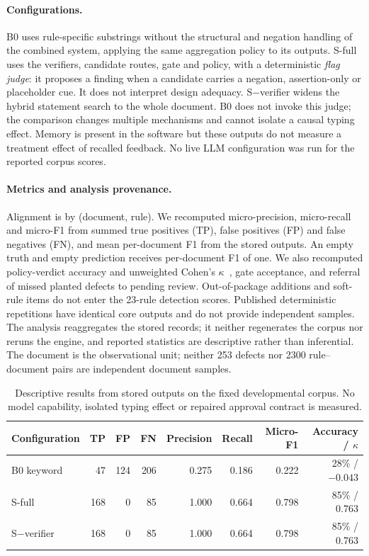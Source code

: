 \documentclass[computers,article,submit,moreauthors]{Definitions/mdpi}
\begin{document}
\paragraph{Configurations.}
B0 uses rule-specific substrings without the structural and negation handling of the combined system, applying the same aggregation policy to its outputs. S-full uses the verifiers, candidate routes, gate and policy, with a deterministic \emph{flag judge}: it proposes a finding when a candidate carries a negation, assertion-only or placeholder cue. It does not interpret design adequacy. S$-$verifier widens the hybrid statement search to the whole document. B0 does not invoke this judge; the comparison changes multiple mechanisms and cannot isolate a causal typing effect. Memory is present in the software but these outputs do not measure a treatment effect of recalled feedback. No live LLM configuration was run for the reported corpus scores.

\paragraph{Metrics and analysis provenance.}
Alignment is by (document, rule). We recomputed micro-precision, micro-recall and micro-F1 from summed true positives (TP), false positives (FP) and false negatives (FN), and mean per-document F1 from the stored outputs. An empty truth and empty prediction receives per-document F1 of one. We also recomputed policy-verdict accuracy and unweighted Cohen's $\kappa$~\cite{cohen1960,landis1977}, gate acceptance, and referral of missed planted defects to pending review. Out-of-package additions and soft-rule items do not enter the 23-rule detection scores. Published deterministic repetitions have identical core outputs and do not provide independent samples. The analysis reaggregates the stored records; it neither regenerates the corpus nor reruns the engine, and reported statistics are descriptive rather than inferential. The document is the observational unit; neither 253 defects nor 2300 rule--document pairs are independent document samples.

\begin{table}[!ht]
\caption{Descriptive results from stored outputs on the fixed developmental corpus. No model capability, isolated typing effect or repaired approval contract is measured.}
\label{tab:results}
\centering\footnotesize
\begin{tabular}{@{}lrrrrrrr@{}}
\toprule
Configuration & TP & FP & FN & Precision & Recall & Micro-F1 & Accuracy / $\kappa$ \\
\midrule
B0 keyword & 47 & 124 & 206 & 0.275 & 0.186 & 0.222 & 28\% / $-0.043$ \\
S-full & 168 & 0 & 85 & 1.000 & 0.664 & 0.798 & 85\% / 0.763 \\
S$-$verifier & 168 & 0 & 85 & 1.000 & 0.664 & 0.798 & 85\% / 0.763 \\
\bottomrule
\end{tabular}
\end{table}
\end{document}
